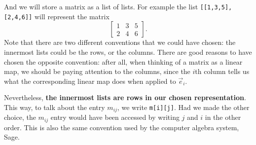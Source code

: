 \documentclass{ximera}
\begin{document}
And we will store a matrix as a list of lists.  For example the list
\verb|[[1,3,5],[2,4,6]]| will represent the matrix
\[
\begin{bmatrix}
 1 & 3 & 5 \\
 2 & 4 & 6  
\end{bmatrix}.
\]
Note that there are two different conventions that we could have
chosen: the innermost lists could be the rows, or the columns.  There
are good reasons to have chosen the opposite convention: after all,
when thinking of a matrix as a linear map, we should be paying
attention to the columns, since the $i$th column tells us what the
corresponding linear map does when applied to $\vec{e}_i$.

Nevertheless, \textbf{the innermost lists are rows in our chosen
  representation}.  This way, to talk about the entry $m_{ij}$, we
write \verb|m[i][j]|.  Had we made the other choice, the $m_{ij}$
entry would have been accessed by writing $j$ and $i$ in the other
order.  This is also the same convention used by the computer algebra
system, Sage.
\end{document}
